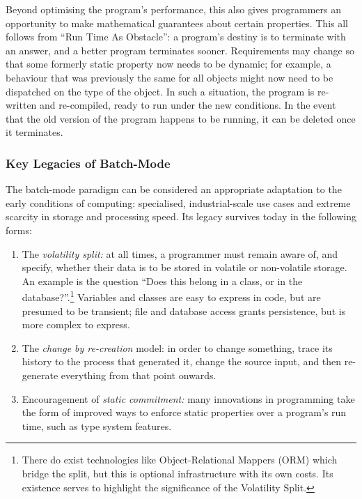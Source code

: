 \documentclass[ twoside,openright,titlepage,numbers=noenddot,headinclude,footinclude,cleardoublepage=empty,abstract=on,
                BCOR=5mm,paper=a4,fontsize=11pt
                ]{scrreprt}
\providecommand{\tightlist}{}\newenvironment{longtable}[2]{\begin{tabular}}{\end{tabular}}
\theoremstyle{definition}
\begin{document}
Beyond optimising the program's performance, this also gives programmers
an opportunity to make mathematical guarantees about certain properties.
This all follows from ``Run Time As Obstacle'': a program's destiny is
to terminate with an answer, and a better program terminates sooner.
Requirements may change so that some formerly static property now needs
to be dynamic; for example, a behaviour that was previously the same for
all objects might now need to be dispatched on the type of the object.
In such a situation, the program is re-written and re-compiled, ready to
run under the new conditions. In the event that the old version of the
program happens to be running, it can be deleted once it terminates.

\hypertarget{key-legacies-of-batch-mode}{\subsubsection{Key Legacies of
Batch-Mode}\label{key-legacies-of-batch-mode}}

The batch-mode paradigm can be considered an appropriate adaptation to
the early conditions of computing: specialised, industrial-scale use
cases and extreme scarcity in storage and processing speed. Its legacy
survives today in the following forms:

\begin{enumerate}
\def\labelenumi{\arabic{enumi}.}
\tightlist
\item
  The \emph{volatility split:} at all times, a programmer must remain
  aware of, and specify, whether their data is to be stored in volatile
  or non-volatile storage. An example is the question ``Does this belong
  in a class, or in the database?''.\footnote{There do exist
    technologies like Object-Relational Mappers (ORM) which bridge the
    split, but this is optional infrastructure with its own costs. Its
    existence serves to highlight the significance of the Volatility
    Split.} Variables and classes are easy to express in code, but are
  presumed to be transient; file and database access grants persistence,
  but is more complex to express.
\item
  The \emph{change by re-creation} model: in order to change something,
  trace its history to the process that generated it, change the source
  input, and then re-generate everything from that point onwards.
\item
  Encouragement of \emph{static commitment:} many innovations in
  programming take the form of improved ways to enforce static
  properties over a program's run time, such as type system features.
\end{enumerate}
\end{document}
